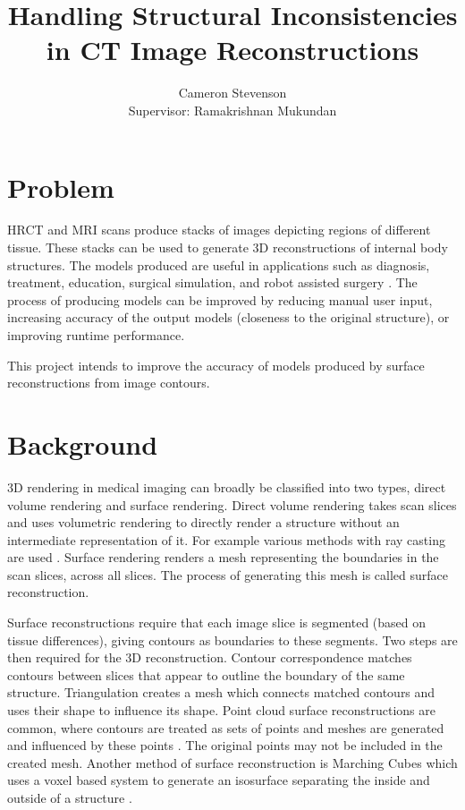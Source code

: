 \documentclass{IEEEtran}
\title{Handling Structural Inconsistencies in CT Image Reconstructions}
\author{Cameron Stevenson\\[1cm]{\small Supervisor: Ramakrishnan Mukundan}}
\begin{document}
\maketitle

\section{Problem}

HRCT and MRI scans produce stacks of images depicting regions of different tissue. These stacks can be used to generate 3D reconstructions of internal body structures. The models produced are useful in applications such as diagnosis, treatment, education, surgical simulation, and robot assisted surgery \cite{mackay2019robust, mukundan2016reconstruction}. The process of producing models can be improved by reducing manual user input, increasing accuracy of the output models (closeness to the original structure), or improving runtime performance. 

This project intends to improve the accuracy of models produced by surface reconstructions from image contours.

\section{Background}

3D rendering in medical imaging can broadly be classified into two types, direct volume rendering and surface rendering. Direct volume rendering takes scan slices and uses volumetric rendering to directly render a structure without an intermediate representation of it. For example various methods with ray casting are used \cite{meyer2009voreen}. Surface rendering renders a mesh representing the boundaries in the scan slices, across all slices. The process of generating this mesh is called surface reconstruction. 

Surface reconstructions require that each image slice is segmented (based on tissue differences), giving contours as boundaries to these segments. Two steps are then required for the 3D reconstruction. Contour correspondence matches contours between slices that appear to outline the boundary of the same structure. Triangulation creates a mesh which connects matched contours and uses their shape to influence its shape. Point cloud surface reconstructions are common, where contours are treated as sets of points and meshes are generated and influenced by these points \cite{berger2017survey}. The original points may not be included in the created mesh. Another method of surface reconstruction is Marching Cubes which uses a voxel based system to generate an isosurface separating the inside and outside of a structure \cite{newman2006survey}.
\end{document}
